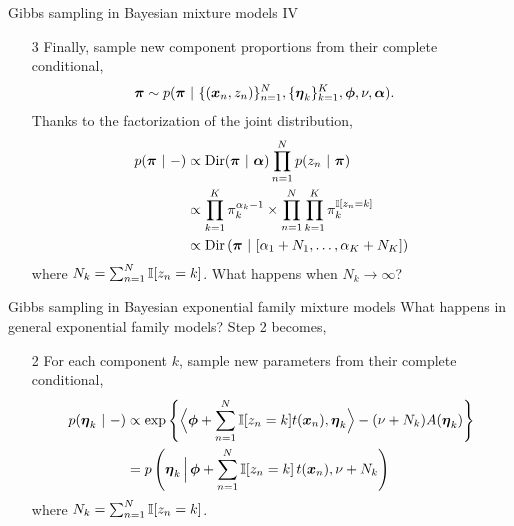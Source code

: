 \documentclass[aspectratio=169]{beamer}
\begin{document}
\begin{frame}{Gibbs sampling in Bayesian mixture models IV}
\begin{enumerate}
    \item[3] Finally, sample new component proportions from their complete conditional,
    \begin{align}
        \boldsymbol{\pi} &\sim p(\boldsymbol{\pi} ~\vert~ \{(\boldsymbol{x}_n, z_n)\}_{n=1}^N, \{\boldsymbol{\eta}_{k}\}_{k=1}^K, \boldsymbol{\phi}, \nu, \boldsymbol{\alpha}).
    \end{align}
    Thanks to the factorization of the joint distribution,
    \begin{align}
        p(\boldsymbol{\pi} ~\vert~ -) &\propto \mathrm{Dir}(\boldsymbol{\pi} ~\vert~ \boldsymbol{\alpha}) \prod_{n=1}^N p(z_n ~\vert~ \boldsymbol{\pi}) \\
        &\propto \prod_{k=1}^K \pi_k^{\alpha_k - 1} \times \prod_{n=1}^N \prod_{k=1}^K \pi_k^{\mathbb{I}[z_n = k]} \\
        &\propto \mathrm{Dir} \left(\boldsymbol{\pi} ~\vert~ [\alpha_1 + N_1, \ldots, \alpha_K + N_K] \right)
    \end{align}
    where $N_k = \sum_{n=1}^N \mathbb{I}[z_n =k]$. What happens when $N_k \to \infty$?
\end{enumerate}
\end{frame}

\begin{frame}{Gibbs sampling in Bayesian exponential family mixture models}
What happens in general exponential family models? Step 2 becomes,
\begin{enumerate}
    \item[2] For each component $k$, sample new parameters from their complete conditional,
    \begin{align}
        p(\boldsymbol{\eta}_k ~\vert~ -) 
        &\propto \exp \left\{ \Big\langle \boldsymbol{\phi} + \sum_{n=1}^N \mathbb{I}[z_n=k] t(\boldsymbol{x}_n), \boldsymbol{\eta}_k \Big \rangle - (\nu + N_k) A(\boldsymbol{\eta}_k) \right\} \\
        &= p \left(\boldsymbol{\eta}_k \,\Big|\, \boldsymbol{\phi} + \sum_{n=1}^N \mathbb{I}[z_n=k] \, t(\boldsymbol{x}_n), \nu + N_k \right)
    \end{align}
    where $N_k = \sum_{n=1}^N \mathbb{I}[z_n =k]$. 
\end{enumerate}
\end{frame}
\end{document}
